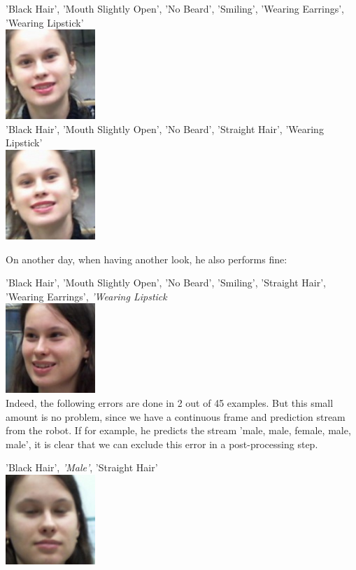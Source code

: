 \documentclass[12.5pt]{scrartcl}
\begin{document}
	'Black Hair', 'Mouth Slightly Open', 'No Beard', 'Smiling', 'Wearing Earrings', 'Wearing Lipstick' \\
	\includegraphics[height=0.1\textheight]{images/leti_normalised110} \\ 
	'Black Hair', 'Mouth Slightly Open', 'No Beard', 'Straight Hair', 'Wearing Lipstick' \\
	\includegraphics[height=0.1\textheight]{images/leti_normalised111} 
	
	On another day, when having another look, he also performs fine:
	
	'Black Hair', 'Mouth Slightly Open', 'No Beard', 'Smiling', 'Straight Hair', 'Wearing Earrings', \emph{'Wearing Lipstick}
	 \\
	\includegraphics[height=0.1\textheight]{images/leti_normalised24}\\
	
	Indeed, the following errors are done in 2 out of 45 examples. But this small amount is no problem, since we have a continuous frame and prediction stream from the robot. If for example, he predicts the stream 'male, male, female, male, male', it is clear that we can exclude this error in a post-processing step.
	
	'Black Hair', \emph{'Male'}, 'Straight Hair'\\
	\includegraphics[height=0.1\textheight]{images/leti_normalised0}
\end{document}
